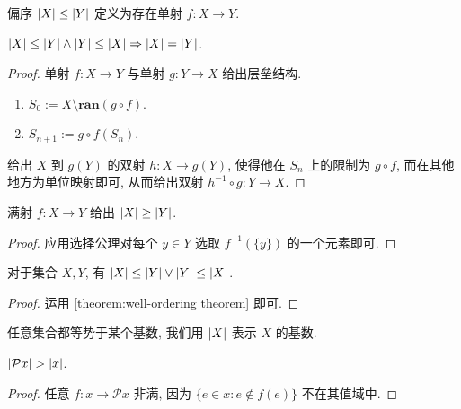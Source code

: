 \begin{definition}
    偏序 \(\abs{X} \le \abs{Y}\) 定义为存在单射 \(f : X \to Y\).
\end{definition}

\begin{lemma}
    \(\abs{X} \le \abs{Y} \land \abs{Y} \le \abs{X} \Rightarrow \abs{X} = \abs{Y}\).

    \begin{proof}
        单射 \(f : X \to Y\) 与单射 \(g : Y \to X\) 给出层垒结构.

        \begin{enumerate}
            \item \(S_0 := X \setminus \mathbf{ran} (g \circ f)\).
            \item \(S_{n + 1} := g \circ f (S_n)\).
        \end{enumerate}

        给出 \(X\) 到 \(g(Y)\) 的双射 \(h : X \to g(Y)\),
        使得他在 \(S_n\) 上的限制为 \(g \circ f\), 而在其他地方为单位映射即可, 从而给出双射 \(h^{-1} \circ g : Y \to X\).
    \end{proof}
\end{lemma}

\begin{lemma}
    满射 \(f : X \to Y\) 给出 \(\abs{X} \ge \abs{Y}\).

    \begin{proof}
        应用选择公理对每个 \(y \in Y\) 选取 \(f^{-1} (\{y\})\) 的一个元素即可.
    \end{proof}
\end{lemma}

\begin{lemma}
    对于集合 \(X, Y\), 有 \(\abs{X} \le \abs{Y} \lor \abs{Y} \le \abs{X}\).

    \begin{proof}
        运用 \ref{theorem:well-ordering theorem} 即可.
    \end{proof}
\end{lemma}

\begin{corollary}
    任意集合都等势于某个基数, 我们用 \(\abs{X}\) 表示 \(X\) 的基数.
\end{corollary}

\begin{theorem*}
    [Cantor] \label{theorem:Cantor's Px > x} \(\abs{\mathcal{P} x} > \abs{x}\).

    \begin{proof}
        任意 \(f : x \to \mathcal{P} x\) 非满, 因为 \(\{e \in x : e \notin f(e)\}\) 不在其值域中.
    \end{proof}
\end{theorem*}

